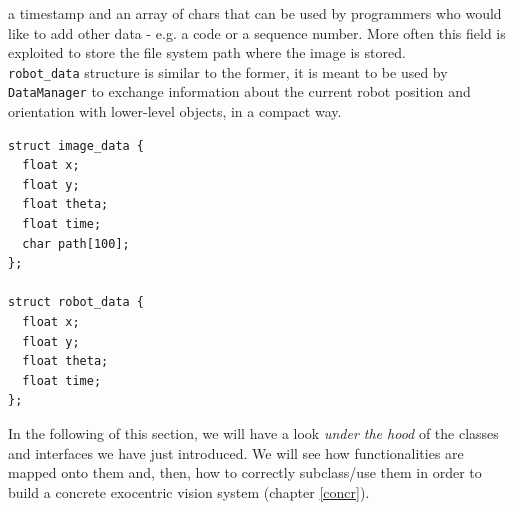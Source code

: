 a timestamp and an array of chars that can be used by 
programmers who would like to add other data - e.g. 
a code or a sequence number. More often this field is
exploited to store the file system path where the
image is stored.
\\
\texttt{robot\_data} structure is similar to the former,
it is meant to be 
used by \texttt{DataManager} to exchange information
about the current robot position and orientation with 
lower-level objects, in a compact way.
\\
\begin{lstlisting}[caption={\framework{} data structures}, label={code:data}]
struct image_data {
  float x;
  float y;
  float theta;
  float time;
  char path[100];
};

struct robot_data {
  float x;
  float y;
  float theta;
  float time;
};
\end{lstlisting}

In the following of this section, we will have a look 
\textit{under the hood} of the classes and interfaces 
we have just introduced.
We will see how \framework{} functionalities are 
mapped onto them and, then, how to correctly subclass/use
them in order to build a concrete exocentric vision system
(chapter \ref{concr}).
